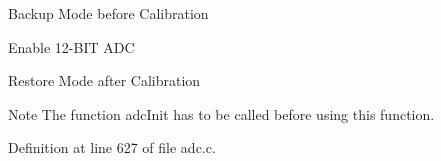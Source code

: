\begin{DoxyItemize}
\item Backup Mode before Calibration ~\newline
~\newline
~\newline

\item Enable 12-\/\+B\+IT A\+DC ~\newline
~\newline

\item Restore Mode after Calibration ~\newline
 \begin{DoxyNote}{Note}
The function adc\+Init has to be called before using this function. 
\end{DoxyNote}

\end{DoxyItemize}

Definition at line 627 of file adc.\+c.


